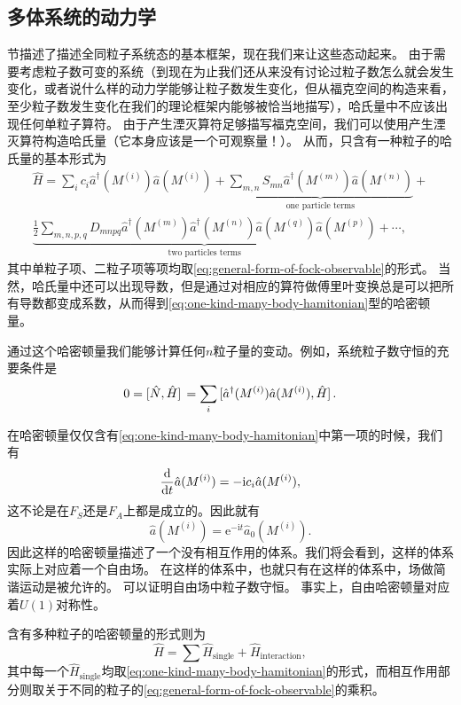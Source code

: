 \documentclass[hyperref, UTF8, a4paper]{ctexart}
\newcommand*{\ii}{\mathrm{i}}
\newcommand*{\ee}{\mathrm{e}}
\renewcommand{\autoref}{\prettyref}
\begin{document}
\subsection{多体系统的动力学}\label{sec:many-body-dynamics}

\autoref{sec:many-body-state}节描述了描述全同粒子系统态的基本框架，现在我们来让这些态动起来。
由于需要考虑粒子数可变的系统（到现在为止我们还从来没有讨论过粒子数怎么就会发生变化，或者说什么样的动力学能够让粒子数发生变化，但从福克空间的构造来看，至少粒子数发生变化在我们的理论框架内能够被恰当地描写），哈氏量中不应该出现任何单粒子算符。
由于产生湮灭算符足够描写福克空间，我们可以使用产生湮灭算符构造哈氏量（它本身应该是一个可观察量！）。
从而，只含有一种粒子的哈氏量的基本形式为
\begin{equation}
    \begin{split}
        \hat{H} = \sum_i c_i \hat{a}^\dagger (M^{(i)}) \hat{a} (M^{(i)}) + \underbrace{\sum_{m, n} S_{mn} \hat{a}^\dagger (M^{(m)}) \hat{a} (M^{(n)}) }_\text{one particle terms} + \\
        \underbrace{\frac{1}{2} \sum_{m, n, p, q} D_{mnpq} \hat{a}^\dagger (M^{(m)}) \hat{a}^\dagger (M^{(n)}) \hat{a} (M^{(q)}) \hat{a} (M^{(p)}) }_\text{two particles terms} + \cdots,
    \end{split}
    \label{eq:one-kind-many-body-hamitonian}
\end{equation}
其中单粒子项、二粒子项等项均取\eqref{eq:general-form-of-fock-observable}的形式。
当然，哈氏量中还可以出现导数，但是通过对相应的算符做傅里叶变换总是可以把所有导数都变成系数，从而得到\eqref{eq:one-kind-many-body-hamitonian}型的哈密顿量。

通过这个哈密顿量我们能够计算任何$n$粒子量的变动。例如，系统粒子数守恒的充要条件是
\begin{equation}
    0 = \comm*{\hat{N}}{\hat{H}} = \sum_i \comm*{\hat{a}^\dagger (M^{(i)}) \hat{a} (M^{(i)})}{\hat{H}}.
\end{equation}

在哈密顿量仅仅含有\eqref{eq:one-kind-many-body-hamitonian}中第一项的时候，我们有
\[
    \dv{t} \hat{a}(M^{(i)}) = - \ii c_i \hat{a} (M^{(i)}),
\]
这不论是在$F_S$还是$F_A$上都是成立的。因此就有
\[
    \hat{a} (M^{(i)}) = \ee^{- \ii t} \hat{a}_0 (M^{(i)}).
\]
因此这样的哈密顿量描述了一个没有相互作用的体系。我们将会看到，这样的体系实际上对应着一个自由场。
在这样的体系中，也就只有在这样的体系中，场做简谐运动是被允许的。
可以证明自由场中粒子数守恒。
事实上，自由哈密顿量对应着$U(1)$对称性。

含有多种粒子的哈密顿量的形式则为
\begin{equation}
    \hat{H} = \sum \hat{H}_\text{single} + \hat{H}_\text{interaction},
\end{equation}
其中每一个$\hat{H}_\text{single}$均取\eqref{eq:one-kind-many-body-hamitonian}的形式，而相互作用部分则取关于不同的粒子的\eqref{eq:general-form-of-fock-observable}的乘积。
\end{document}
